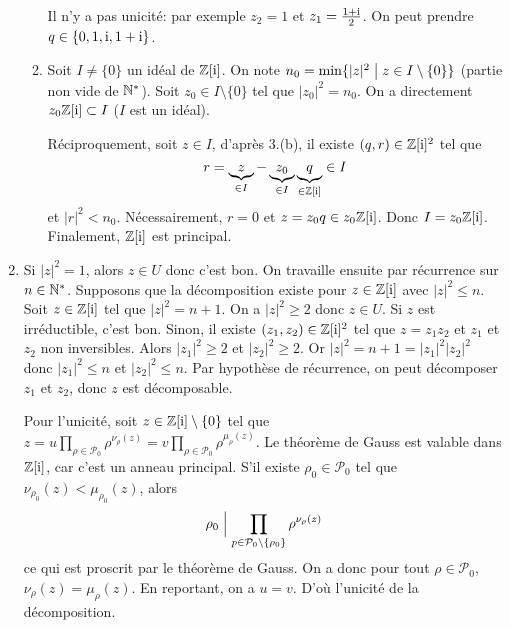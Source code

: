 \begin{solution}
\begin{enumerate}
\begin{enumerate}
			Il n'y a pas unicité: par exemple $z_{2}=1$ et $z_{1}=\frac{1+\mathrm{i}}{2}$. On peut prendre $q\in\{0,1,\mathrm{i},1+\mathrm{i}\}$.

			\item Soit $I\neq\{0\}$ un idéal de $\mathbb{Z}[\mathrm{i}]$. On note $n_{0}=\min\{\vert z\vert^{2}\bigm| z\in I\setminus\{0\}\}$ (partie non vide de $\mathbb{N}^{*}$). Soit $z_{0}\in I\setminus\{0\}$ tel que $\vert z_{0}\vert^{2}=n_{0}$. On a directement $z_{0}\mathbb{Z}[\mathrm{i}]\subset I$ ($I$ est un idéal). 
			
			Réciproquement, soit $z\in I$, d'après 3.(b), il existe $(q,r)\in\mathbb{Z}[\mathrm{i}]^{2}$ tel que 
			$$r=\underbrace{z}_{\in I}-\underbrace{z_{0}}_{\in I}\underbrace{q}_{\in\mathbb{Z}[\mathrm{i}]}\in I$$ 
			et $\vert r\vert^{2}<n_{0}$. Nécessairement, $r=0$ et $z=z_{0}q\in z_{0}\mathbb{Z}[\mathrm{i}]$. Donc $I=z_{0}\mathbb{Z}[\mathrm{i}]$. Finalement, $\mathbb{Z}[\mathrm{i}]$ est principal.
		\end{enumerate}

		
		\item Si $\vert z\vert^{2}=1$, alors $z\in U$ donc c'est bon. On travaille ensuite par récurrence sur $n\in\mathbb{N}^{*}$. Supposons que la décomposition existe pour $z\in\mathbb{Z}[\mathrm{i}]$ avec $\vert z\vert^{2}\leqslant n$. Soit $z\in\mathbb{Z}[\mathrm{i}]$ tel que $\vert z\vert^{2}=n+1$. On a $\vert z\vert^{2}\geqslant2$ donc $z\in U$. Si $z$ est irréductible, c'est bon. Sinon, il existe $(z_{1},z_{2})\in\mathbb{Z}[\mathrm{i}]^{2}$ tel que $z=z_{1}z_{2}$ et $z_{1}$ et $z_{2}$ non inversibles. Alors $\vert z_{1}\vert^{2}\geqslant2$ et $\vert z_{2}\vert^{2}\geqslant2$. Or $\vert z\vert^{2}=n+1=\vert z_{1}\vert^{2}\vert z_{2}\vert^{2}$ donc $\vert z_{1}\vert^{2}\leqslant n$ et $\vert z_{2}\vert^{2}\leqslant n$. Par hypothèse de récurrence, on peut décomposer $z_{1}$ et $z_{2}$, donc $z$ est décomposable.
			
		Pour l'unicité, soit $z\in\mathbb{Z}[\mathrm{i}]\setminus\{0\}$ tel que $z=u\prod_{\rho\in\mathcal{P}_{0}}\rho^{\nu_{\rho}(z)}=v\prod_{\rho\in\mathcal{P}_{0}}\rho^{\mu_{\rho}(z)}$. Le théorème de Gauss est valable dans $\mathbb{Z}[\mathrm{i}]$, car c'est un anneau principal. S'il existe $\rho_{0}\in\mathcal{P}_{0}$ tel que $\nu_{\rho_{0}}(z)<\mu_{\rho_{0}}(z)$, alors 
		$$\rho_{0}\Bigm|\prod_{p\in\mathcal{P}_{0}\setminus\{\rho_{0}\}}\rho^{\nu_{\rho}(z)}$$
		ce qui est proscrit par le théorème de Gauss. On a donc pour tout $\rho\in\mathcal{P}_{0}$, $\nu_{\rho}(z)=\mu_{\rho}(z)$. En reportant, on a $u=v$. D'où l'unicité de la décomposition.
	\end{enumerate}
\end{solution}

